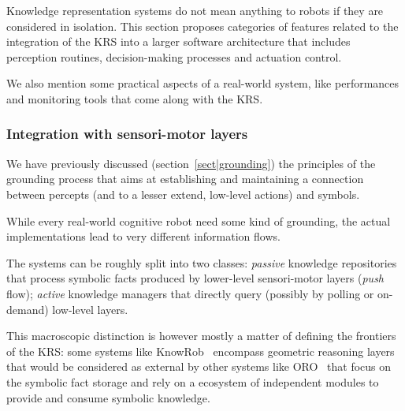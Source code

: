 \begin{scriptsize}
\begin{center}
\end{center}
\end{scriptsize}


Knowledge representation systems do not mean anything to robots if they are
considered in isolation. This section proposes categories of features related
to the integration of the KRS into a larger software architecture that includes
perception routines, decision-making processes and actuation control.

We also mention some practical aspects of a real-world system, like
performances and monitoring tools that come along with the KRS.

\subsubsection{Integration with sensori-motor layers}
\label{sect|integration-sensorimotor}

We have previously discussed (section~\ref{sect|grounding}) the principles of
the grounding process that aims at establishing and maintaining a connection
between percepts (and to a lesser extend, low-level actions) and symbols.

While every real-world cognitive robot need some kind of grounding, the actual
implementations lead to very different information flows.

The systems can be roughly split into two classes: \emph{passive} knowledge
repositories that process symbolic facts produced by lower-level sensori-motor
layers (\emph{push} flow); \emph{active} knowledge managers that directly query
(possibly by polling or on-demand) low-level layers.

This macroscopic distinction is however mostly a matter of defining the
frontiers of the KRS: some systems like KnowRob~\cite{Tenorth2009a} encompass
geometric reasoning layers that would be considered as external by other
systems like ORO~\cite{Lemaignan2010} that focus on the symbolic fact storage
and rely on a ecosystem of independent modules to provide and consume symbolic
knowledge.


